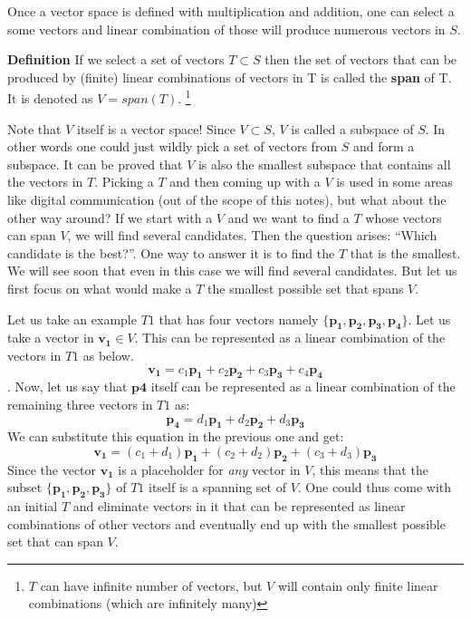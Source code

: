 Once a vector space is defined with multiplication and addition, one can select a some vectors and linear combination of those will produce numerous vectors in \(S\). 

	\begin{highlightedText}
	\textbf{Definition} If we select a set of vectors \(T \subset S \) then the set of vectors that can be produced by (finite) linear combinations of vectors in T is called the \textbf{span} of T. It is denoted as \(V = span(T)\). \footnote{\(T\) can have infinite number of vectors, but \(V\) will contain only finite linear combinations (which are infinitely many)}
	\end{highlightedText}

Note that \(V\) itself is a vector space! Since \( V \subset S \), \(V\) is called a subspace of \(S\). In other words one could just wildly pick a set of vectors from \(S\) and form a subspace. It can be proved that \(V\) is also the smallest subspace that contains all the vectors in \(T\). Picking a \(T\) and then coming up with a \(V\) is used in some areas like digital communication (out of the scope of this notes), but what about the other way around? If we start with a \(V\) and we want to find a \(T\) whose vectors can span \(V\), we will find several candidates. Then the question arises: ``Which candidate is the best?''. One way to answer it is to find the \(T\) that is the smallest. We will see soon that even in this case we will find several candidates. But let us first focus on what would make a \(T\) the smallest  possible set that spans \(V\). 

Let us take an example \(T1\) that has four vectors namely \( \{ \mathbf{p_1}, \mathbf{p_2}, \mathbf{p_3}, \mathbf{p_4} \} \). Let us take a vector in \(\mathbf{v_1} \in V\). This can be represented as a linear combination of the vectors in \(T1\) as below.
	\[ \mathbf{v_1} = c_1\mathbf{p_1} + c_2\mathbf{p_2} + c_3\mathbf{p_3} + c_4\mathbf{p_4} \].
Now, let us say that \(\mathbf{p4} \) itself can be represented as a linear combination of the remaining three vectors in \(T1\) as:
	\[ \mathbf{p_4} = d_1\mathbf{p_1} + d_2\mathbf{p_2} + d_3\mathbf{p_3} \]
We can substitute this equation in the previous one and get:
	\[\mathbf{ v_1} = (c_1+d_1)\mathbf{p_1} + (c_2+d_2)\mathbf{p_2} + (c_3+d_3)\mathbf{p_3} \]
Since the vector \( \mathbf{v_1} \) is a placeholder for \emph{any} vector in \(V\), this means that the subset \( \{ \mathbf{p_1}, \mathbf{p_2}, \mathbf{p_3} \} \) of \(T1\) itself is a spanning set of \(V\). One could thus come with an initial \(T\) and eliminate vectors in it that can be represented as linear combinations of other vectors and eventually end up with the smallest possible set that can span \(V\). 
	
